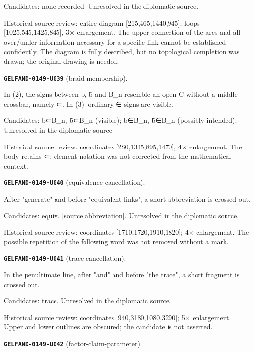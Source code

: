 \documentclass[11pt]{article}
\theoremstyle{definition}
\theoremstyle{remark}
\begin{document}
Candidates: none recorded. Unresolved in the diplomatic source.\par
Historical source review: entire diagram [215,465,1440,945]; loops [1025,545,1425,845], 3× enlargement. The upper connection of the arcs and all over/under information necessary for a specific link cannot be established confidently. The diagram is fully described, but no topological completion was drawn; the original drawing is needed.\par\medskip
\noindent\leavevmode{}\label{GELFAND-P001375:braid-membership:note}\textbf{\texttt{GELFAND-0149-U039}} (braid-membership).\par\nopagebreak[4]
In (2), the signs between b, b̃ and B\_n resemble an open C without a middle crossbar, namely ⊂. In (3), ordinary ∈ signs are visible.\par
Candidates: b⊂B\_n, b̃⊂B\_n (visible); b∈B\_n, b̃∈B\_n (possibly intended). Unresolved in the diplomatic source.\par
Historical source review: coordinates [280,1345,895,1470]; 4× enlargement. The body retains ⊂; element notation was not corrected from the mathematical context.\par\medskip
\noindent\leavevmode{}\label{GELFAND-P001375:equivalence-cancellation:note}\textbf{\texttt{GELFAND-0149-U040}} (equivalence-cancellation).\par\nopagebreak[4]
After "generate" and before "equivalent links", a short abbreviation is crossed out.\par
Candidates: equiv. [source abbreviation]. Unresolved in the diplomatic source.\par
Historical source review: coordinates [1710,1720,1910,1820]; 4× enlargement. The possible repetition of the following word was not removed without a mark.\par\medskip
\noindent\leavevmode{}\label{GELFAND-P001375:trace-cancellation:note}\textbf{\texttt{GELFAND-0149-U041}} (trace-cancellation).\par\nopagebreak[4]
In the penultimate line, after "and" and before "the trace", a short fragment is crossed out.\par
Candidates: trace. Unresolved in the diplomatic source.\par
Historical source review: coordinates [940,3180,1080,3290]; 5× enlargement. Upper and lower outlines are obscured; the candidate is not asserted.\par\medskip
\noindent\leavevmode{}\label{GELFAND-P001375:factor-claim-parameter:note}\textbf{\texttt{GELFAND-0149-U042}} (factor-claim-parameter).\par\nopagebreak[4]
\end{document}

